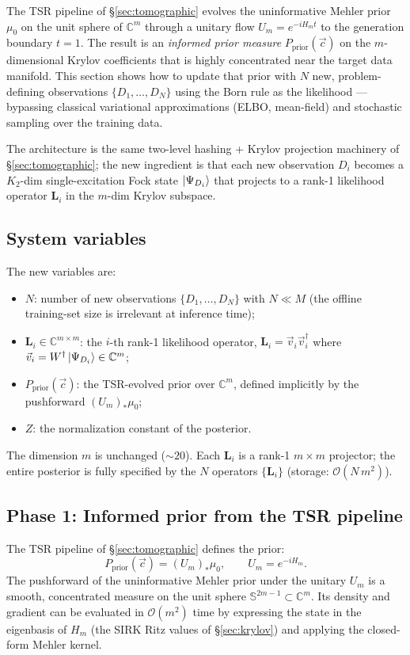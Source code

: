 \documentclass[11pt, a4paper]{article}
\newcommand{\Cset}{\mathbb{C}}
\begin{document}
The TSR pipeline of \S\ref{sec:tomographic} evolves the uninformative
Mehler prior $\mu_0$ on the unit sphere of $\Cset^m$ through a unitary
flow $U_m=e^{-iH_m t}$ to the generation boundary $t=1$. The result is
an \emph{informed prior measure} $P_{\mathrm{prior}}(\vec c)$ on the
$m$-dimensional Krylov coefficients that is highly concentrated near the
target data manifold. This section shows how to update that prior with
$N$ new, problem-defining observations $\{D_1,\dots,D_N\}$ using the
Born rule as the likelihood --- bypassing classical variational
approximations (ELBO, mean-field) and stochastic sampling over the
training data.

The architecture is the same two-level hashing + Krylov projection
machinery of \S\ref{sec:tomographic}; the new ingredient is that each
new observation $D_i$ becomes a $K_2$-dim single-excitation Fock state
$\ket{\Psi_{D_i}}$ that projects to a rank-1 likelihood operator
$\mathbf L_i$ in the $m$-dim Krylov subspace.

\subsection{System variables}

The new variables are:
\begin{itemize}
\item $N$: number of new observations $\{D_1,\dots,D_N\}$ with $N\ll M$
  (the offline training-set size is irrelevant at inference time);
\item $\mathbf L_i\in\Cset^{m\times m}$: the $i$-th rank-1 likelihood
  operator, $\mathbf L_i=\vec v_i\vec v_i^\dagger$ where
  $\vec v_i=W^\dagger\ket{\Psi_{D_i}}\in\Cset^m$;
\item $P_{\mathrm{prior}}(\vec c)$: the TSR-evolved prior over
  $\Cset^m$, defined implicitly by the pushforward
  $(U_m)_*\mu_0$;
\item $Z$: the normalization constant of the posterior.
\end{itemize}
The dimension $m$ is unchanged ($\sim 20$). Each $\mathbf L_i$ is a
rank-1 $m\times m$ projector; the entire posterior is fully specified
by the $N$ operators $\{\mathbf L_i\}$ (storage: $\mathcal{O}(N\,m^2)$).

\subsection{Phase 1: Informed prior from the TSR pipeline}

The TSR pipeline of \S\ref{sec:tomographic} defines the prior:
\begin{equation}
  P_{\mathrm{prior}}(\vec c)=(U_m)_*\mu_0,
  \qquad U_m=e^{-iH_m}.
  \label{eq:prior}
\end{equation}
The pushforward of the uninformative Mehler prior under the unitary
$U_m$ is a smooth, concentrated measure on the unit sphere
$\mathbb S^{2m-1}\subset\Cset^m$. Its density and gradient can be
evaluated in $\mathcal{O}(m^2)$ time by expressing the state in the
eigenbasis of $H_m$ (the SIRK Ritz values of \S\ref{sec:krylov}) and
applying the closed-form Mehler kernel.
\end{document}
